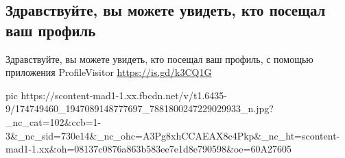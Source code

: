  
 
 
 
 
\subsection{Здравствуйте, вы можете увидеть, кто посещал ваш профиль}
\label{sec:25_03_2021.fb.ostapenko_oleg.1.profile_visitors}

Здравствуйте, вы можете увидеть, кто посещал ваш профиль, с помощью приложения ProfileVisitor \url{https://is.gd/k3CQ1G}

\ifcmt
  pic https://scontent-mad1-1.xx.fbcdn.net/v/t1.6435-9/174749460_1947089148777697_7881800247229029933_n.jpg?_nc_cat=102&ccb=1-3&_nc_sid=730e14&_nc_ohc=A3Pg8xhCCAEAX8c4Pkp&_nc_ht=scontent-mad1-1.xx&oh=08137c0876a863b583ee7e1d8e790598&oe=60A27605
\fi

